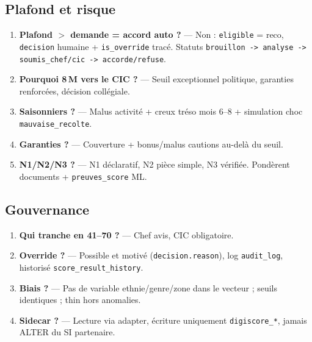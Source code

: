 \documentclass[11pt,a4paper]{article}
\begin{document}
\subsection{Plafond et risque}
\begin{enumerate}[resume]
  \item \textbf{Plafond $>$ demande = accord auto ?} --- Non : \texttt{eligible} = reco, \texttt{decision} humaine + \texttt{is\_override} tracé. Statuts \texttt{brouillon -> analyse -> soumis\_chef/cic -> accorde/refuse}.
  \item \textbf{Pourquoi 8\,M vers le CIC ?} --- Seuil exceptionnel politique, garanties renforcées, décision collégiale.
  \item \textbf{Saisonniers ?} --- Malus activité + creux tréso mois 6--8 + simulation choc \texttt{mauvaise\_recolte}.
  \item \textbf{Garanties ?} --- Couverture + bonus/malus cautions au-delà du seuil.
  \item \textbf{N1/N2/N3 ?} --- N1 déclaratif, N2 pièce simple, N3 vérifiée. Pondèrent documents + \texttt{preuves\_score} ML.
\end{enumerate}

\subsection{Gouvernance}
\begin{enumerate}[resume]
  \item \textbf{Qui tranche en 41--70 ?} --- Chef avis, CIC obligatoire.
  \item \textbf{Override ?} --- Possible et motivé (\texttt{decision.reason}), log \texttt{audit\_log}, historisé \texttt{score\_result\_history}.
  \item \textbf{Biais ?} --- Pas de variable ethnie/genre/zone dans le vecteur ; seuils identiques ; thin hors anomalies.
  \item \textbf{Sidecar ?} --- Lecture via adapter, écriture uniquement \texttt{digiscore\_*}, jamais ALTER du SI partenaire.
\end{enumerate}
\end{document}
